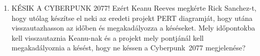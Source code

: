 \documentclass[a4paper,12pt]{article}
\begin{document}
\begin{enumerate}
            \item KÉSIK A CYBERPUNK 2077! Ezért Keanu Reeves megkérte Rick Sanchez-t, hogy utólag készítse el neki az eredeti projekt PERT diagramját, hogy utána visszautazhasson az időben és megakadályozza a késéseket. Mely időpontokba kell visszautaznia Keanu-nak és a projekt mely pontjánál kell megakadályoznia a késést, hogy ne késsen a Cyberpunk~2077 megjelenése?
            \begin{figure}[!h]
                \centering
                
            \end{figure}
        \end{enumerate}
    
\end{document}
